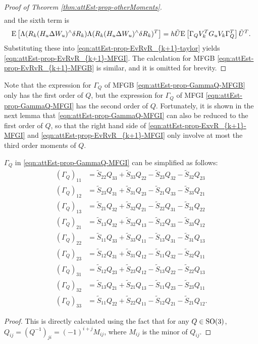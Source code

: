 \begin{proof}[Proof of Theorem \ref{thm:attEst-prop-otherMoments}]
\begin{align*}
	\end{align*}
	and the sixth term is
	\begin{align*}
		\mathrm{E}\left[ \Lambda( R_k(H_u\Delta W_u)^\wedge\delta R_k ) \Lambda( R_k(H_u\Delta W_u)^\wedge\delta R_k )^T \right] = h\tilde{U} \mathrm{E}\left[ \Gamma_Q V_k^T G_u V_k \Gamma_Q^T \right] \tilde{U}^T.
	\end{align*}
	Substituting these into \eqref{eqn:attEst-prop-EvRvR_{k+1}-taylor} yields \eqref{eqn:attEst-prop-EvRvR_{k+1}-MFGI}.
	The calculation for MFGB \eqref{eqn:attEst-prop-EvRvR_{k+1}-MFGB} is similar, and it is omitted for brevity.
\end{proof}

Note that the expression for $\Gamma_Q$ of MFGB \eqref{eqn:attEst-prop-GammaQ-MFGB} only has the first order of $Q$, but the expression for $\Gamma_Q$ of MFGI \eqref{eqn:attEst-prop-GammaQ-MFGI} has the second order of $Q$.
Fortunately, it is shown in the next lemma that \eqref{eqn:attEst-prop-GammaQ-MFGI} can also be reduced to the first order of $Q$, so that the right hand side of \eqref{eqn:attEst-prop-ExvR_{k+1}-MFGI} and \eqref{eqn:attEst-prop-EvRvR_{k+1}-MFGI} only involve at most the third order moments of $Q$.

\begin{lemma} \label{lemma:attEst-GammaQ}
	$\Gamma_Q$ in \eqref{eqn:attEst-prop-GammaQ-MFGI} can be simplified as follows:
	\begin{align}
		(\Gamma_Q)_{11} &= \tilde{S}_{22}Q_{33} + \tilde{S}_{33}Q_{22} - \tilde{S}_{23}Q_{32} - \tilde{S}_{32}Q_{23} \nonumber \\
		(\Gamma_Q)_{12} &= \tilde{S}_{23}Q_{31} + \tilde{S}_{31}Q_{23} - \tilde{S}_{21}Q_{33} - \tilde{S}_{33}Q_{21} \nonumber \\
		(\Gamma_Q)_{13} &= \tilde{S}_{21}Q_{32} + \tilde{S}_{32}Q_{21} - \tilde{S}_{22}Q_{31} - \tilde{S}_{31}Q_{22} \nonumber \\
		(\Gamma_Q)_{21} &= \tilde{S}_{13}Q_{32} + \tilde{S}_{32}Q_{13} - \tilde{S}_{12}Q_{33} - \tilde{S}_{33}Q_{12} \nonumber \\
		(\Gamma_Q)_{22} &= \tilde{S}_{11}Q_{33} + \tilde{S}_{33}Q_{11} - \tilde{S}_{13}Q_{31} - \tilde{S}_{31}Q_{13} \nonumber \\
		(\Gamma_Q)_{23} &= \tilde{S}_{12}Q_{31} + \tilde{S}_{31}Q_{12} - \tilde{S}_{11}Q_{32} - \tilde{S}_{32}Q_{11} \nonumber \\
		(\Gamma_Q)_{31} &= \tilde{S}_{12}Q_{23} + \tilde{S}_{23}Q_{12} - \tilde{S}_{13}Q_{22} - \tilde{S}_{22}Q_{13} \nonumber \\
		(\Gamma_Q)_{32} &= \tilde{S}_{13}Q_{21} + \tilde{S}_{21}Q_{13} - \tilde{S}_{11}Q_{23} - \tilde{S}_{23}Q_{11} \nonumber \\
		(\Gamma_Q)_{33} &= \tilde{S}_{11}Q_{22} + \tilde{S}_{22}Q_{11} - \tilde{S}_{12}Q_{21} - \tilde{S}_{21}Q_{12}.
	\end{align}
\end{lemma}
\begin{proof}
	This is directly calculated using the fact that for any $Q\in\mathrm{SO}(3)$, $Q_{ij} = (Q^{-1})_{ji} =(-1)^{i+j}M_{ij}$, where $M_{ij}$ is the minor of $Q_{ij}$.
\end{proof}
